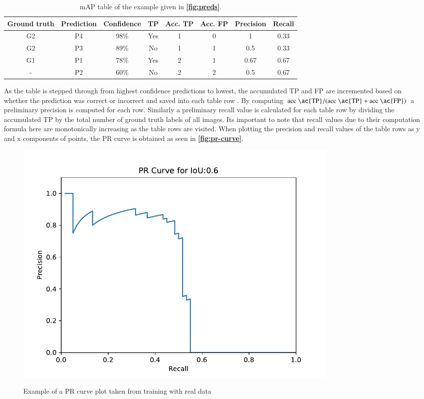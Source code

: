 \documentclass[10pt]{book}
\newcommand{\figureref}[1]{\textbf{\autoref{#1}}}
\begin{document}
\begin{table}
  \begin{tabular}{ c c c c c c c c }
   Ground truth & Prediction & Confidence & TP & Acc. TP & Acc. FP & Precision & Recall \\ 
   \hline
   G2 & P4 & 98\% & Yes & 1 & 0 & 1 & 0.33 \\
   G2 & P3 & 89\% & No & 1 & 1 & 0.5 & 0.33 \\
   G1 & P1 & 78\% & Yes & 2 & 1 & 0.67 & 0.67 \\
   - & P2 & 60\% & No & 2 & 2 & 0.5 & 0.67 \\
   \hline
  \end{tabular}
  \caption{\label{tab:mAP}\ac{mAP} table of the example given in \figureref{fig:preds}.}
\end{table}

As the table is stepped through from highest confidence predictions to lowest, the accumulated TP and FP are incremented based on whether the prediction was correct or incorrect and saved into each table row \cite{padilla2020survey}. By computing $\text{acc \ac{TP}} / (\text{acc \ac{TP}} + \text{acc \ac{FP}})$ a preliminary precision is computed for each row. Similarly a preliminary recall value is calculated for each table row by dividing the accumulated \ac{TP} by the total number of ground truth labels of all images. Its important to note that recall values due to their computation formula here are monotonically increasing as the table rows are visited. When plotting the precision and recall values of the table rows as y and x components of points, the \ac{PR curve} is obtained as seen in \figureref{fig:pr-curve}.

\begin{figure}
  \caption{Example of a \ac{PR curve} plot taken from training with real data}
  \includegraphics[width=0.8\textwidth]{image/eval_PR_Curve_0.60}
  \label{fig:pr-curve}
\end{figure}
\end{document}
